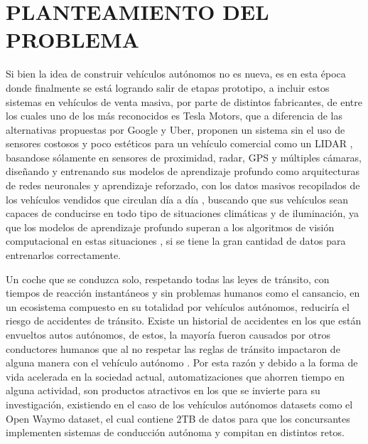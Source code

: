 \section{PLANTEAMIENTO DEL PROBLEMA}
Si bien la idea de construir vehículos autónomos no es nueva, es en esta época donde finalmente se está logrando salir de etapas prototipo, a incluir estos sistemas en vehículos de venta masiva, por parte de distintos fabricantes, de entre los cuales uno de los más reconocidos es Tesla Motors, que a diferencia de las alternativas propuestas por Google y Uber, proponen un sistema sin el uso de sensores costosos y poco estéticos para un vehículo comercial como un LIDAR \citep{granath_2020}, basandose sólamente en sensores de proximidad, radar, GPS y múltiples cámaras, diseñando y entrenando sus modelos de aprendizaje profundo como arquitecturas de redes neuronales y aprendizaje reforzado, con los datos masivos recopilados de los vehículos vendidos que circulan día a día \citep{karpathy-scaledml}, buscando que sus vehículos sean capaces de conducirse en todo tipo de situaciones climáticas y de iluminación, ya que los modelos de aprendizaje profundo superan a los algoritmos de visión computacional en estas situaciones \citep{Goodfellow-et-al-2016}, si se tiene la gran cantidad de datos para entrenarlos correctamente. \citep{alexnet}

Un coche que se conduzca solo, respetando todas las leyes de tránsito, con tiempos de reacción instantáneos y sin problemas humanos como el cansancio, en un ecosistema compuesto en su totalidad por vehículos autónomos, reduciría el riesgo de accidentes de tránsito. Existe un historial de accidentes en los que están envueltos autos autónomos, de estos, la mayoría fueron causados por otros conductores humanos que al no respetar las reglas de tránsito impactaron de alguna manera con el vehículo autónomo \citep{wikipedia_2020}. Por esta razón y debido a la forma de vida acelerada en la sociedad actual, automatizaciones que ahorren tiempo en alguna actividad, son productos atractivos en los que se invierte para su investigación, existiendo en el caso de los vehículos autónomos datasets como el Open Waymo dataset, el cual contiene 2TB de datos para que los concursantes implementen sistemas de conducción autónoma y compitan en distintos retos. \citep{waymo}


